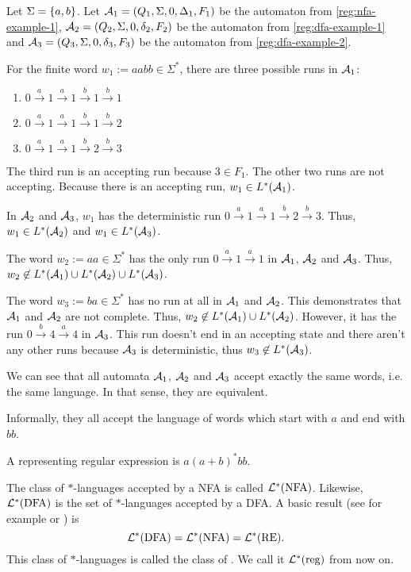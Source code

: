 \begin{simpleexample}
Let $\Sigma = \Set{a,b}$. Let $\mathcal{A}_1 = (Q_1,\Sigma,0,\Delta_1,F_1)$ be the automaton from \cref{reg:nfa-example-1}, $\mathcal{A}_2 = (Q_2,\Sigma,0,\delta_2,F_2)$ be the automaton from \cref{reg:dfa-example-1} and $\mathcal{A}_3 = (Q_3,\Sigma,0,\delta_3,F_3)$ be the automaton from \cref{reg:dfa-example-2}.

For the finite word $w_1 := aabb \in \Sigma^*$, there are three possible runs in $\mathcal{A}_1$:
\begin{enumerate}
\item $0 \xrightarrow{a} 1 \xrightarrow{a} 1 \xrightarrow{b} 1 \xrightarrow{b} 1$
\item $0 \xrightarrow{a} 1 \xrightarrow{a} 1 \xrightarrow{b} 1 \xrightarrow{b} 2$
\item $0 \xrightarrow{a} 1 \xrightarrow{a} 1 \xrightarrow{b} 2 \xrightarrow{b} 3$
\end{enumerate}
The third run is an accepting run because $3 \in F_1$. The other two runs are not accepting. Because there is an accepting run, $w_1 \in L^*(\mathcal{A}_1)$.

In $\mathcal{A}_2$ and $\mathcal{A}_3$, $w_1$ has the deterministic run $0 \xrightarrow{a} 1 \xrightarrow{a} 1 \xrightarrow{b} 2 \xrightarrow{b} 3$. Thus, $w_1 \in L^*(\mathcal{A}_2)$ and $w_1 \in L^*(\mathcal{A}_3)$.

The word $w_2 := aa \in \Sigma^*$ has the only run $0 \xrightarrow{a} 1 \xrightarrow{a} 1$ in $\mathcal{A}_1$, $\mathcal{A}_2$ and $\mathcal{A}_3$. Thus, $w_2 \not\in L^*(\mathcal{A}_1) \cup L^*(\mathcal{A}_2) \cup L^*(\mathcal{A}_3)$.

The word $w_3 := ba \in \Sigma^*$ has no run at all in $\mathcal{A}_1$ and $\mathcal{A}_2$. This demonstrates that $\mathcal{A}_1$ and $\mathcal{A}_2$ are not complete. Thus, $w_2 \not\in L^*(\mathcal{A}_1) \cup L^*(\mathcal{A}_2)$. However, it has the run $0 \xrightarrow{b} 4 \xrightarrow{a} 4$ in $\mathcal{A}_3$. This run doesn't end in an accepting state and there aren't any other runs because $\mathcal{A}_3$ is deterministic, thus $w_3 \not\in L^*(\mathcal{A}_3)$.

We can see that all automata $\mathcal{A}_1$, $\mathcal{A}_2$ and $\mathcal{A}_3$ accept exactly the same words, i.e. the same language. In that sense, they are equivalent.

Informally, they all accept the language of words which start with $a$ and end with $bb$.

A representing regular expression is $a(a+b)^*bb$.
\end{simpleexample}

The class of $*$-languages accepted by a NFA is called $\mathcal{L}^*(\text{NFA})$. Likewise, $\mathcal{L}^*(\text{DFA})$ is the set of $*$-languages accepted by a DFA. A basic result (see for example \cite{FinAutLogR109} or \cite{InfWordsR110}) is
\[ \mathcal{L}^*(\text{DFA}) = \mathcal{L}^*(\text{NFA}) = \mathcal{L}^*(\text{RE}) . \]
This class of $*$-languages is called the class of . We call it $\mathcal{L}^*(\textup{\textrm{reg}})$ from now on.

